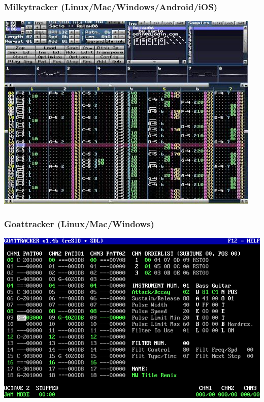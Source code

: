 \documentclass{beamer}
\begin{document}
\begin{frame}
\frametitle{Milkytracker (Linux/Mac/Windows/Android/iOS)}
\begin{center}
\includegraphics[scale=0.5]{milkytracker}
\end{center}
\end{frame}

\begin{frame}
\frametitle{Goattracker (Linux/Mac/Windows)}
\begin{center}
\includegraphics[scale=0.4]{goattracker}
\end{center}
\end{frame}
\end{document}
